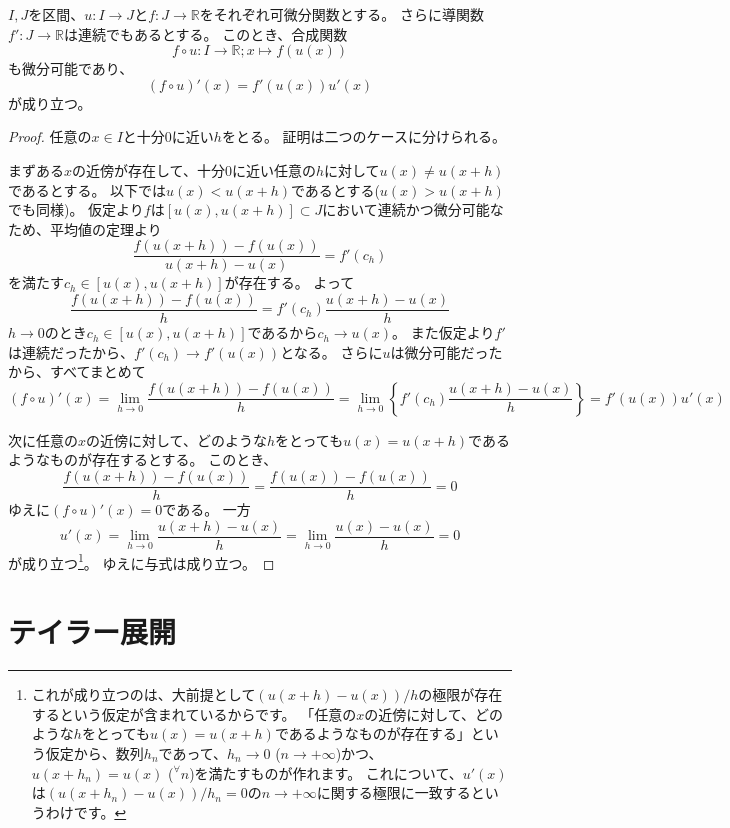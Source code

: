\begin{corollary}[合成関数の微分]
  $I,J$を区間、$u:I\to J$と$f:J\to\mathbb{R}$をそれぞれ可微分関数とする。
  さらに導関数$f':J\to\mathbb{R}$は連続でもあるとする。
  このとき、合成関数
  \[
    f\circ u:I\to\mathbb{R};x\mapsto f(u(x))
  \]
  も微分可能であり、
  \[
    (f\circ u)'(x)=f'(u(x))u'(x)
  \]
  が成り立つ。
\end{corollary}
\begin{proof}
  任意の$x\in I$と十分0に近い$h$をとる。
  証明は二つのケースに分けられる。

  まずある$x$の近傍が存在して、十分0に近い任意の$h$に対して$u(x)\neq u(x+h)$であるとする。
  以下では$u(x)<u(x+h)$であるとする($u(x)>u(x+h)$でも同様)。
  仮定より$f$は$[u(x),u(x+h)]\subset J$において連続かつ微分可能なため、平均値の定理より
  \[
    \frac{f(u(x+h))-f(u(x))}{u(x+h)-u(x)}=f'(c_h)
  \]
  を満たす$c_h\in[u(x),u(x+h)]$が存在する。
  よって
  \[
    \frac{f(u(x+h))-f(u(x))}{h}=f'(c_h)\frac{u(x+h)-u(x)}{h}
  \]
  $h\to0$のとき$c_h\in[u(x),u(x+h)]$であるから$c_h\to u(x)$。
  また仮定より$f'$は連続だったから、$f'(c_h)\to f'(u(x))$となる。
  さらに$u$は微分可能だったから、すべてまとめて
  \[
    (f\circ u)'(x)=\lim_{h\to0}\frac{f(u(x+h))-f(u(x))}{h}=\lim_{h\to0}\left\{f'(c_h)\frac{u(x+h)-u(x)}{h}\right\}=f'(u(x))u'(x)
  \]

  次に任意の$x$の近傍に対して、どのような$h$をとっても$u(x)=u(x+h)$であるようなものが存在するとする。
  このとき、
  \[
    \frac{f(u(x+h))-f(u(x))}{h}=\frac{f(u(x))-f(u(x))}{h}=0
  \]
  ゆえに$(f\circ u)'(x)=0$である。
  一方
  \[
    u'(x)=\lim_{h\to0}\frac{u(x+h)-u(x)}{h}=\lim_{h\to0}\frac{u(x)-u(x)}{h}=0
  \]
  が成り立つ\footnote{
    これが成り立つのは、大前提として$(u(x+h)-u(x))/h$の極限が存在するという仮定が含まれているからです。
    「任意の$x$の近傍に対して、どのような$h$をとっても$u(x)=u(x+h)$であるようなものが存在する」という仮定から、数列$h_n$であって、$h_n\to0$ ($n\to+\infty$)かつ、$u(x+h_n)=u(x)$ (${}^\forall n$)を満たすものが作れます。
    これについて、$u'(x)$は$(u(x+h_n)-u(x))/h_n=0$の$n\to+\infty$に関する極限に一致するというわけです。
  }。
  ゆえに与式は成り立つ。
\end{proof}



\section{テイラー展開}
